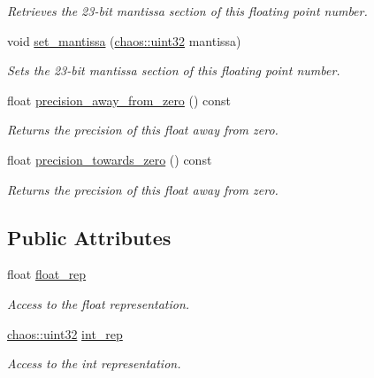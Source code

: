 \begin{DoxyCompactItemize}
\begin{DoxyCompactList}\small\item\em Retrieves the 23-\/bit mantissa section of this floating point number. \end{DoxyCompactList}\item 
void \hyperlink{unionchaos_1_1data_1_1_bitwise_float_a57629a8a0c7aaff58ba05bcab7831ce6}{set\-\_\-mantissa} (\hyperlink{namespacechaos_a8641b3ae4551f0b35570d4f9f4ec22d9}{chaos\-::uint32} mantissa)
\begin{DoxyCompactList}\small\item\em Sets the 23-\/bit mantissa section of this floating point number. \end{DoxyCompactList}\item 
float \hyperlink{unionchaos_1_1data_1_1_bitwise_float_ab38870254ea2295c45556e9aa51c2554}{precision\-\_\-away\-\_\-from\-\_\-zero} () const 
\begin{DoxyCompactList}\small\item\em Returns the precision of this float away from zero. \end{DoxyCompactList}\item 
float \hyperlink{unionchaos_1_1data_1_1_bitwise_float_a4acc915134b0cdab21c6e3c30842754d}{precision\-\_\-towards\-\_\-zero} () const 
\begin{DoxyCompactList}\small\item\em Returns the precision of this float away from zero. \end{DoxyCompactList}\end{DoxyCompactItemize}
\subsection*{Public Attributes}
\begin{DoxyCompactItemize}
\item 
\hypertarget{unionchaos_1_1data_1_1_bitwise_float_ab763103c6f0079798d187c8c27612259}{float \hyperlink{unionchaos_1_1data_1_1_bitwise_float_ab763103c6f0079798d187c8c27612259}{float\-\_\-rep}}\label{unionchaos_1_1data_1_1_bitwise_float_ab763103c6f0079798d187c8c27612259}

\begin{DoxyCompactList}\small\item\em Access to the float representation. \end{DoxyCompactList}\item 
\hypertarget{unionchaos_1_1data_1_1_bitwise_float_a5dc7a9d68bc17cecceec14da1ac9b592}{\hyperlink{namespacechaos_a8641b3ae4551f0b35570d4f9f4ec22d9}{chaos\-::uint32} \hyperlink{unionchaos_1_1data_1_1_bitwise_float_a5dc7a9d68bc17cecceec14da1ac9b592}{int\-\_\-rep}}\label{unionchaos_1_1data_1_1_bitwise_float_a5dc7a9d68bc17cecceec14da1ac9b592}

\begin{DoxyCompactList}\small\item\em Access to the int representation. \end{DoxyCompactList}\end{DoxyCompactItemize}


